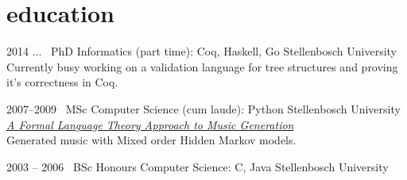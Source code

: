 \documentclass[print]{friggeri-cv-a4} %
\begin{document}
\section{education}

\begin{entrylist}

\entry
{2014 ...}
{\faIndent\ PhD {\normalfont Informatics} (part time): {\normalfont Coq, Haskell, Go}}
{Stellenbosch University}
{Currently busy working on a validation language for tree structures and proving it's correctness in Coq.}

\entry
{2007--2009}
{\faMusic\ MSc {\normalfont Computer Science} (cum laude): {\normalfont Python}}
{Stellenbosch University}
{\href{http://superwillow.sourceforge.net/}{\emph{A Formal Language Theory Approach to Music Generation}} \\ Generated music with Mixed order Hidden Markov models.}

\entry
{2003 -- 2006}
{\faGraduationCap\ BSc Honours {\normalfont Computer Science: C, Java}}
{Stellenbosch University}
{}

\end{entrylist}
\end{document}
